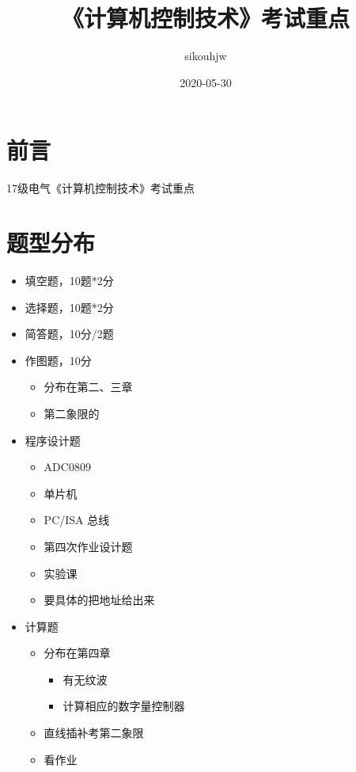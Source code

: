 \documentclass[zihao=-4
]{ctexart}%
\title{《计算机控制技术》考试重点}
\author{sikouhjw}
\date{2020-05-30}
\begin{document}
\sffamily
\maketitle

\hypertarget{header-n2}{%
\section{前言}\label{header-n2}}

17级电气《计算机控制技术》考试重点

\hypertarget{header-n4}{%
\section{题型分布}\label{header-n4}}

\begin{itemize}
\item
  填空题，10题*2分
\item
  选择题，10题*2分
\item
  简答题，10分/2题
\item
  作图题，10分

  \begin{itemize}
  \item
    分布在第二、三章
  \item
    第二象限的
  \end{itemize}
\item
  程序设计题

  \begin{itemize}
  \item
    ADC0809
  \item
    单片机
  \item
    PC/ISA 总线
  \item
    第四次作业设计题
  \item
    实验课
  \item
    要具体的把地址给出来
  \end{itemize}
\item
  计算题

  \begin{itemize}
  \item
    分布在第四章

    \begin{itemize}
    \item
      有无纹波
    \item
      计算相应的数字量控制器
    \end{itemize}
  \item
    直线插补考第二象限
  \item
    看作业
  \end{itemize}
\end{itemize}
\end{document}
